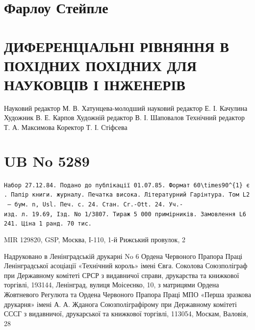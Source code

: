 \documentclass[
  ukrainian,
]{article}
\begin{document}
\section{Фарлоу
Стейпле}\label{ux444ux430ux440ux43bux43eux443-ux441ux442ux435ux439ux43fux43bux435}

\section{ДИФЕРЕНЦІАЛЬНІ РІВНЯННЯ В ПОХІДНИХ ПОХІДНИХ ДЛЯ НАУКОВЦІВ І
ІНЖЕНЕРІВ}\label{ux434ux438ux444ux435ux440ux435ux43dux446ux456ux430ux43bux44cux43dux456-ux440ux456ux432ux43dux44fux43dux43dux44f-ux432-ux43fux43eux445ux456ux434ux43dux438ux445-ux43fux43eux445ux456ux434ux43dux438ux445-ux434ux43bux44f-ux43dux430ux443ux43aux43eux432ux446ux456ux432-ux456-ux456ux43dux436ux435ux43dux435ux440ux456ux432}

Науковий редактор М. В. Хатунцева-молодший науковий редактор Е. І.
Качулина Художник В. Е. Карпов Художній редактор В. І. Шаповалов
Технічний редактор Т. А. Максимова Коректор Т. І. Стіфсева

\section{UB No 5289}\label{ub-no-5289}

\texttt{Набор\ 27.12.84.\ Подано\ до\ публікації\ 01.07.85.\ Формат\ \textquotesingle{}60\textbackslash{}times90\^{}\{1\}\textquotesingle{}\ є.\ Папір\ книги.\ журналу.\ Печатка\ висока.\ Літературний\ Гарінтура.\ Том\ L2\ —\ бум.\ n,\ Usl.\ Печ.\ с.\ 24.\ Стан.\ Cr.-Ott.\ 24.\ Уч.-изд.\ л.\ 19.69,\ Ізд.\ No\ 1/3807.\ Тираж\ 5\ 000\ примірників.\ Замовлення\ L6\ 241.\ Ціна\ 1\ ранд.\ 70\ тис.}

MIR 129820, GSP, Москва, I-110, 1-й Рижський провулок, 2

Надруковано в Ленінградській друкарні No 6 Ордена Червоного Прапора
Праці Ленінградської асоціації «Технічний король» імені Євга. Соколова
Союзполіграф при Державному комітеті СРСР з видавничої справи,
друкарства та книжкової торгівлі, 193144, Ленінград, вулиця Моісеєнко,
10, з матрицями Ордена Жовтневого Регулюта та Ордена Червоного Прапора
Праці МПО «Перша зразкова друкарня» імені А. А. Жданога
Союзполіграфірому при Державному комітеті СССГ з видавничої, друкарської
та книжкової торгівлі, 113054, Москам, Валовія, 28
\end{document}
